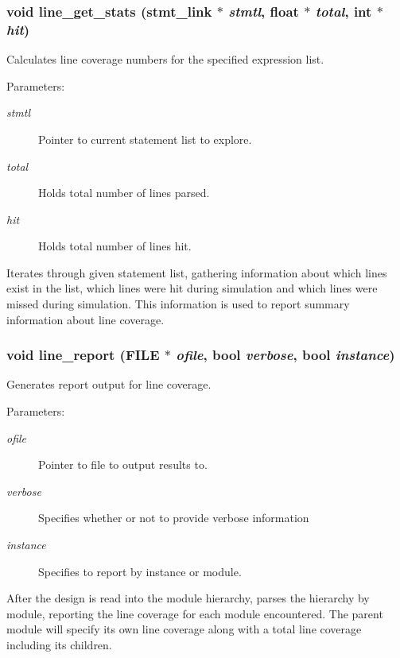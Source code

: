 \subsubsection{\setlength{\rightskip}{0pt plus 5cm}void line\_\-get\_\-stats ({\bf stmt\_\-link} $\ast$ {\em stmtl}, float $\ast$ {\em total}, int $\ast$ {\em hit})}\label{line_8h_a0}


Calculates line coverage numbers for the specified expression list.

\begin{Desc}
\item[Parameters: ]\par
\begin{description}
\item[{\em 
stmtl}]Pointer to current statement list to explore. \item[{\em 
total}]Holds total number of lines parsed. \item[{\em 
hit}]Holds total number of lines hit.\end{description}
\end{Desc}
Iterates through given statement list, gathering information about which lines exist in the list, which lines were hit during simulation and which lines were missed during simulation. This information is used to report summary information about line coverage. 
\subsubsection{\setlength{\rightskip}{0pt plus 5cm}void line\_\-report (FILE $\ast$ {\em ofile}, {\bf bool} {\em verbose}, {\bf bool} {\em instance})}\label{line_8h_a1}


Generates report output for line coverage.

\begin{Desc}
\item[Parameters: ]\par
\begin{description}
\item[{\em 
ofile}]Pointer to file to output results to. \item[{\em 
verbose}]Specifies whether or not to provide verbose information \item[{\em 
instance}]Specifies to report by instance or module.\end{description}
\end{Desc}
After the design is read into the module hierarchy, parses the hierarchy by module, reporting the line coverage for each module encountered. The parent module will specify its own line coverage along with a total line coverage including its  children. 